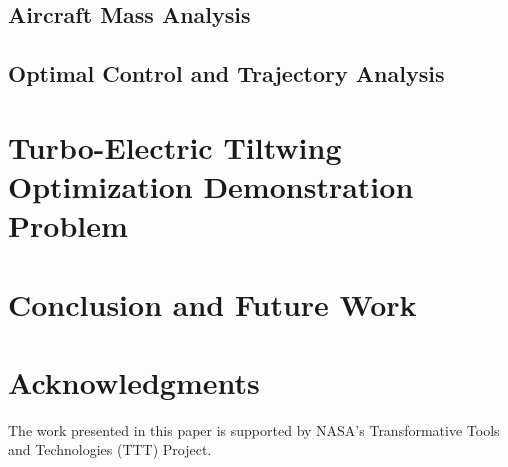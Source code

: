 \documentclass[conf]{new-aiaa}
\begin{document}
\subsection{Aircraft Mass Analysis}

\subsection{Optimal Control and Trajectory Analysis}



\section{Turbo-Electric Tiltwing Optimization Demonstration Problem}\label{sec:opt_prob}


\section{Conclusion and Future Work}\label{sec:conc}


\section*{Acknowledgments}
The work presented in this paper is supported by NASA's Transformative Tools and Technologies (TTT) Project.  


\end{document}
